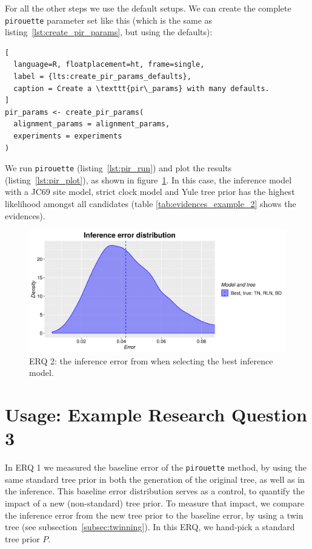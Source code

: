 \documentclass{article}
\begin{document}
For all the other steps we use the default setups. 
We can create the complete
\verb;pirouette; parameter set like this (which is the
same as listing~\ref{lst:create_pir_params}, but using the defaults):

\begin{lstlisting}[
  language=R, floatplacement=ht, frame=single,
  label = {lts:create_pir_params_defaults},
  caption = Create a \texttt{pir\_params} with many defaults.
]
pir_params <- create_pir_params(
  alignment_params = alignment_params,
  experiments = experiments
)
\end{lstlisting}

We run \verb;pirouette; (listing~\ref{lst:pir_run}) 
and plot the results (listing~\ref{lst:pir_plot}),
as shown in figure~\ref{fig:example_2}.
In this case, the inference model with a JC69 site model, 
strict clock model and Yule tree prior has the highest likelihood
amongst all candidates (table \ref{tab:evidences_example_2} shows
the evidences).

\begin{figure}[H]
  \includegraphics[width=\textwidth]{example_2/errors.png}
  \caption{
    ERQ 2: the inference error from
    when selecting the best inference model.
  }
  \label{fig:example_2}
\end{figure}

\section{Usage: Example Research Question 3}

In ERQ 1 we measured the baseline error of the \verb;pirouette; method,
by using the same standard tree prior in both the generation of 
the original tree, as well as in the inference.
This baseline error distribution serves as a control,
to quantify the impact of a new (non-standard) tree prior.
To measure that impact, we compare the inference error 
from the new tree prior to the baseline error,
by using a twin tree (see subsection~\ref{subsec:twinning}).
In this ERQ, we hand-pick a standard tree prior $\mathit{P}$.
\end{document}
